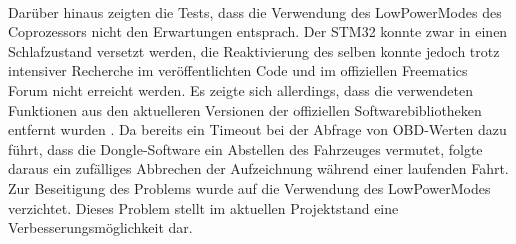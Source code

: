 \paragraph{}
Darüber hinaus zeigten die Tests, dass die Verwendung des LowPowerModes des Coprozessors nicht den Erwartungen entsprach. Der STM32 konnte zwar in einen Schlafzustand versetzt werden, die Reaktivierung des selben konnte jedoch trotz intensiver Recherche im veröffentlichten Code und im offiziellen Freematics Forum nicht erreicht werden. Es zeigte sich allerdings, dass die verwendeten Funktionen aus den aktuelleren Versionen der offiziellen Softwarebibliotheken entfernt wurden \cite{freematicsRevFeb}. Da bereits ein Timeout bei der Abfrage von OBD-Werten dazu führt, dass die Dongle-Software ein Abstellen des Fahrzeuges vermutet, folgte daraus ein zufälliges Abbrechen der Aufzeichnung während einer laufenden Fahrt. Zur Beseitigung des Problems wurde auf die Verwendung des LowPowerModes verzichtet. Dieses Problem stellt im aktuellen Projektstand eine Verbesserungsmöglichkeit dar.
